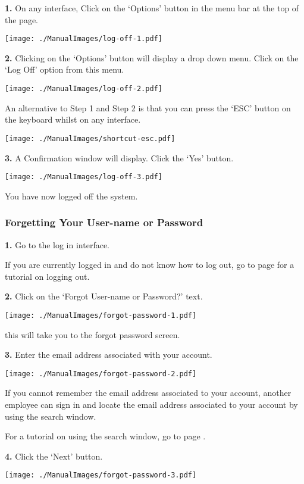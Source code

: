 \textbf{1.}  On any interface, Click on the `Options' button in the menu bar at the top of the page.

\texttt{[image: ./ManualImages/log-off-1.pdf]}

\textbf{2.} Clicking on the `Options' button will display a drop down menu. Click on the `Log Off' option from this menu.

\texttt{[image: ./ManualImages/log-off-2.pdf]}

An alternative to Step 1 and Step 2 is that you can press the `ESC' button on the keyboard whilst on any interface.

\texttt{[image: ./ManualImages/shortcut-esc.pdf]}

\textbf{3.} A Confirmation window will display. Click the `Yes' button.

\texttt{[image: ./ManualImages/log-off-3.pdf]}

You have now logged off the system.

\pagebreak
\subsubsection{Forgetting Your User-name or Password}
\label{fig:Forgetting Your User-name or Password}

\textbf{1.} Go to the log in interface.

If you are currently logged in and do not know how to log out, go to page \pageref{fig:Logging out of the system}  for a tutorial on logging out.

\textbf{2.} Click on the `Forgot User-name or Password?' text.

\texttt{[image: ./ManualImages/forgot-password-1.pdf]}

this will take you to the forgot password screen.

\textbf{3.} Enter the email address associated with your account.

\texttt{[image: ./ManualImages/forgot-password-2.pdf]}

If you cannot remember the email address associated to your account, another employee can sign in and locate the email address associated to your account by using the search window.

For a tutorial on using the search window, go to page .

\textbf{4.} Click the `Next' button.

\texttt{[image: ./ManualImages/forgot-password-3.pdf]}

